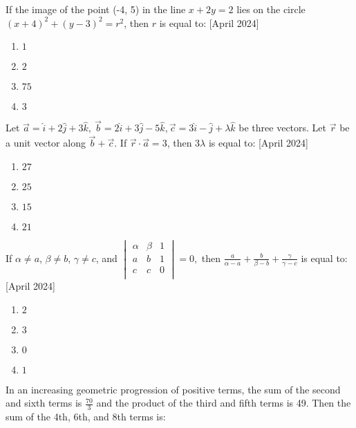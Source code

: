 \iffalse
\title{2024}
\author{AI24BTECH11012}
\section{mcq-single}
\fi
    \item If the image of the point (-4, 5) in the line $x + 2y = 2$ lies on the circle $(x + 4)^2 + (y - 3)^2 = r^2$, then $r$ is equal to:
    \hfill{[April 2024]}
    \begin{enumerate}
        \item $1$
        \item $2$
        \item $75$
        \item $3$
    \end{enumerate}
    
    \item Let $\overrightarrow{a} = \hat{i} + 2\hat{j} + 3\hat{k}, \ \overrightarrow{b} = 2\hat{i} + 3\hat{j} - 5\hat{k}, \overrightarrow{c} = 3\hat{i} - \hat{j} + \lambda\hat{k}$ be three vectors. Let $\overrightarrow{r}$ be a unit vector along $\overrightarrow{b} + \overrightarrow{c}$. If $\overrightarrow{r} \cdot \overrightarrow{a} = 3$, then $3\lambda$ is equal to:
    \hfill{[April 2024]}
    \begin{enumerate}
        \item $27$
        \item $25$
        \item $15$
        \item $21$
    \end{enumerate}
    \item If $\alpha \neq a$, $\beta \neq b$, $\gamma \neq c$, and
$
\begin{vmatrix}
\alpha & \beta & 1 \\
a & b & 1 \\
c & c & 0 \\
\end{vmatrix} = 0,
$
then $\frac{a}{\alpha-a}+\frac{b}{\beta-b}+\frac{\gamma}{\gamma-c}$ is equal to:
\hfill{[April 2024]}
    \begin{enumerate}
        \item $2$
        \item $3$
        \item $0$
        \item $1$
    \end{enumerate}
    \item In an increasing geometric progression of positive terms, the sum of the second and sixth terms is $\frac{70}{3}$ and the product of the third and fifth terms is 49. Then the sum of the 4th, 6th, and 8th terms is:
